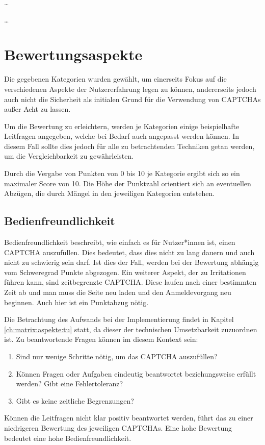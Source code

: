 \dots

\dots


\section{Bewertungsaspekte}
\label{ch:matrix:aspekte}
Die gegebenen Kategorien wurden gewählt, um einerseits Fokus auf die verschiedenen Aspekte der Nutzererfahrung legen zu können,
andererseits jedoch auch nicht die Sicherheit als initialen Grund für die Verwendung von CAPTCHAs außer Acht zu lassen.

Um die Bewertung zu erleichtern, werden je Kategorien einige beispielhafte Leitfragen angegeben, welche bei Bedarf auch angepasst werden können.
In diesem Fall sollte dies jedoch für alle zu betrachtenden Techniken getan werden, um die Vergleichbarkeit zu gewährleisten.

Durch die Vergabe von Punkten von 0 bis 10 je Kategorie ergibt sich so ein maximaler Score von 10.
Die Höhe der Punktzahl orientiert sich an eventuellen Abzügen, die durch Mängel in den jeweiligen Kategorien entstehen.

\subsection{Bedienfreundlichkeit}
\label{ch:matrix:aspekte:Bedienfreundlichkeit}
Bedienfreundlichkeit beschreibt, wie einfach es für Nutzer*innen ist, einen CAPTCHA auszufüllen.
Dies bedeutet, dass dies nicht zu lang dauern und auch nicht zu schwierig sein darf. 
Ist dies der Fall, werden bei der Bewertung abhängig vom Schweregrad Punkte abgezogen. %
Ein weiterer Aspekt, der zu Irritationen führen kann, sind zeitbegrenzte CAPTCHA. 
Diese laufen nach einer bestimmten Zeit ab und man muss die Seite neu laden und den Anmeldevorgang neu beginnen.
Auch hier ist ein Punktabzug nötig.

Die Betrachtung des Aufwands bei der Implementierung findet in Kapitel \ref{ch:matrix:aspekte:tu} statt, da dieser der technischen Umsetzbarkeit zuzuordnen ist.
Zu beantwortende Fragen können im diesem Kontext sein:
\begin{enumerate}
    \item Sind nur wenige Schritte nötig, um das CAPTCHA auszufüllen?
    \item Können Fragen oder Aufgaben eindeutig beantwortet beziehungsweise erfüllt werden? Gibt eine Fehlertoleranz?
    \item Gibt es keine zeitliche Begrenzungen?
\end{enumerate}
Können die Leitfragen nicht klar positiv beantwortet werden, führt das zu einer niedrigeren Bewertung des jeweiligen CAPTCHAs.
Eine hohe Bewertung bedeutet eine hohe Bedienfreundlichkeit. 

